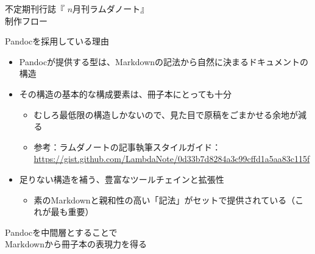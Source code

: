 \documentclass[14pt,dvipdfmx,uplatex]{beamer}
\begin{document}
{%
\begin{frame}[t]{\inhibitglue 不定期刊行誌『 $n$月刊ラムダノート』\\[-0.5ex] 制作フロー\\[-.7\baselineskip]}
  \sffamily
  \begin{center}
  \end{center}
\end{frame}
}

\begin{frame}[t]{\inhibitglue Pandocを採用している理由}
  \sffamily
  \begin{itemize}
    \item Pandocが提供する型は、Markdownの記法から自然に決まるドキュメントの構造
    \item その構造の基本的な構成要素は、冊子本にとっても十分\\
    \begin{itemize}
      \item むしろ最低限の構造しかないので、見た目で原稿をごまかせる余地が減る
      \item 参考：ラムダノートの記事執筆スタイルガイド：\\ {\footnotesize\url{https://gist.github.com/LambdaNote/0d33b7d8284a3c99cffd1a5aa83c115f}}
    \end{itemize}
    \item 足りない構造を補う、豊富なツールチェインと拡張性
    \begin{itemize}
      \item 素のMarkdownと親和性の高い「記法」がセットで提供されている（これが最も重要）
    \end{itemize}
  \end{itemize}
\end{frame}

{%
\begin{frame}[t]{\inhibitglue Pandocを中間層とすることで\\[-0.5ex] Markdownから冊子本の表現力を得る\\[-.7\baselineskip]}
  \sffamily
  \begin{center}
  \end{center}
\end{frame}
}
\end{document}
